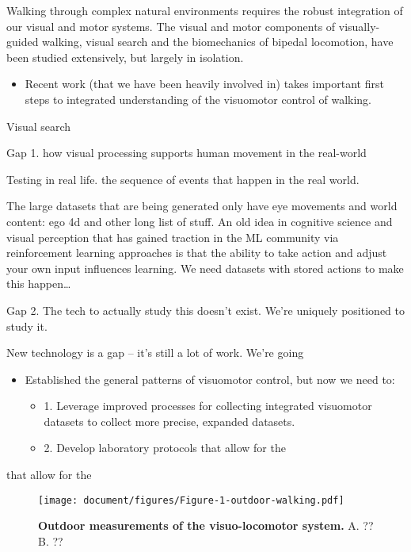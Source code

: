 Walking through complex natural environments requires the robust
integration of our visual and motor systems. The visual and motor
components of visually-guided walking, visual search and the
biomechanics of bipedal locomotion, have been studied extensively, but
largely in isolation.

\begin{itemize}
\item
  Recent work (that we have been heavily involved in) takes important
  first steps to integrated understanding of the visuomotor control of
  walking.
\end{itemize}

Visual search

Gap 1. how visual processing supports human movement in the real-world

Testing in real life. the sequence of events that happen in the real
world.

The large datasets that are being generated only have eye movements and
world content: ego 4d and other long list of stuff. An old idea in
cognitive science and visual perception that has gained traction in the
ML community via reinforcement learning approaches is that the ability
to take action and adjust your own input influences learning. We need
datasets with stored actions to make this happen\ldots{}

Gap 2. The tech to actually study this doesn't exist. We're uniquely
positioned to study it.

New technology is a gap -- it's still a lot of work. We're going

\begin{itemize}
\item
  Established the general patterns of visuomotor control, but now we
  need to:

  \begin{itemize}
  \item
    1. Leverage improved processes for collecting integrated visuomotor
    datasets to collect more precise, expanded datasets.
  \item
    2. Develop laboratory protocols that allow for the
  \end{itemize}
\end{itemize}
that allow for the

\begin{figure}[h]
\centering
\texttt{[image: document/figures/Figure-1-outdoor-walking.pdf]}
\caption{\textbf{Outdoor measurements of the visuo-locomotor system.} A. ?? B. ??}
\end{figure}
